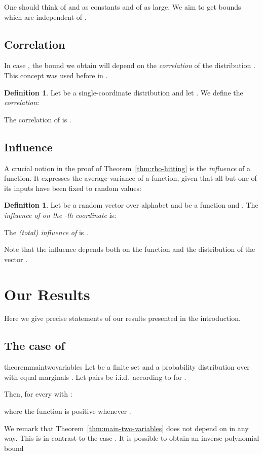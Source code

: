 \documentclass{daj}
\newcommand{\1}{\mathbbm{1}}
\theoremstyle{plain}
\theoremstyle{definition}
\newtheorem{definition}[theorem]{Definition}
\begin{document}
\medskip

One should think of  and  as constants and of  as large.
We aim to get bounds which are independent of .

\subsection{Correlation}
\label{sec:correlation}
In case , the bound we obtain will depend on the
\emph{correlation} of the distribution .
This concept was used before in \cite{Mos10}.

\begin{definition}\label{def:correlation}
Let  be a single-coordinate distribution
and let . We define the \emph{correlation}:

The correlation of  is
.
\end{definition}

\subsection{Influence}

A crucial notion in the proof of Theorem~\ref{thm:rho-hitting} is
the \emph{influence} of a function. It expresses the average variance of a 
function, 
given that all but one of its  inputs have been fixed to random values:
\begin{definition}
Let  be a random vector over alphabet 
and  be a function
and . The \emph{influence of  on the -th coordinate} is:

The \emph{(total) influence of } is 
.
\end{definition}
Note that the influence depends both on the function  and
the distribution of the vector .

\section{Our Results}
\label{sec:results}

Here we give precise statements of our results presented in the introduction.

\subsection{The case of 
\texorpdfstring{}{l = 2}}

\begin{restatable}{theorem}{maintwovariables}
\label{thm:main-two-variables}
Let  be a finite set and
 a probability distribution over  
with equal marginals .
Let pairs  
be i.i.d.~according to  for 
.

Then, for every  with 
:

where the function  is positive whenever
.
\end{restatable}
We remark that Theorem~\ref{thm:main-two-variables} does not depend
on  in any way. 
This is in contrast to the case .
It is possible to obtain an inverse polynomial bound
\end{document}
